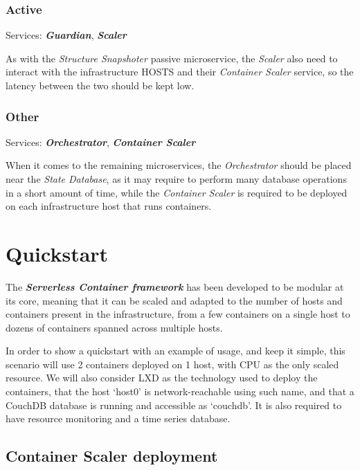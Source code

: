 \documentclass[12pt]{article}
\begin{document}
\subsubsection{Active}

Services: \textbf{\textit{Guardian}}, \textbf{\textit{Scaler}}

As with the \textit{Structure Snapshoter} passive microservice, the \textit{Scaler} also need to interact with the infrastructure HOSTS and their \textit{Container Scaler} service, so the latency between the two should be kept low.


\subsubsection{Other}

Services: \textbf{\textit{Orchestrator}}, \textbf{\textit{Container Scaler}}

When it comes to the remaining microservices, the \textit{Orchestrator} should be placed near the \textit{State Database}, as it may require to perform many database operations in a short amount of time, while the \textit{Container Scaler} is required to be deployed on each infrastructure host that runs containers.

\section{Quickstart}

The \textbf{\textit{Serverless Container framework}} has been developed to be modular at its core, meaning that it can be scaled and adapted to the number of hosts and containers present in the infrastructure, from a few containers on a single host to dozens of containers spanned across multiple hosts.

In order to show a quickstart with an example of usage, and keep it simple, this scenario will use 2 containers deployed on 1 host, with CPU as the only scaled resource. We will also consider LXD as the technology used to deploy the containers, that the host `host0' is network-reachable using such name, and that a CouchDB database is running and accessible as `couchdb'. It is also required to have resource monitoring and a time series database.


\subsection{Container Scaler deployment}
\end{document}
